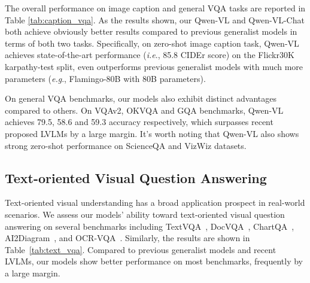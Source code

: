 \documentclass{article}
\begin{document}
The overall performance on image caption and general VQA tasks are reported in Table \ref{tab:caption_vqa}.  As the results shown, our Qwen-VL and Qwen-VL-Chat both achieve obviously better results compared to previous generalist models in terms of both two tasks.
Specifically, on zero-shot image caption task, Qwen-VL achieves state-of-the-art performance (\emph{i.e}., 85.8 CIDEr score) on the Flickr30K karpathy-test split, even outperforms previous generalist models with much more parameters (\emph{e.g}., Flamingo-80B with 80B parameters).

On general VQA benchmarks, our models also exhibit distinct advantages compared to others. On VQAv2, OKVQA and GQA benchmarks, Qwen-VL achieves 79.5, 58.6 and 59.3 accuracy respectively, which surpasses recent proposed LVLMs by a large margin.
It's worth noting that Qwen-VL also shows strong zero-shot performance on ScienceQA and VizWiz datasets.

\subsection{Text-oriented Visual Question Answering}

Text-oriented visual understanding has a broad application prospect in real-world scenarios. We assess our models' ability toward text-oriented visual question answering on several benchmarks including TextVQA~\citep{sidorov2020textcaps}, DocVQA~\citep{docvqa}, ChartQA~\citep{masry2022chartqa}, AI2Diagram~\citep{kembhavi2016diagram}, and OCR-VQA~\citep{ocrvqa}.
Similarly, the results are shown in Table~\ref{tab:text_vqa}. Compared to previous generalist models and recent LVLMs, our models show better performance on most benchmarks, frequently by a large margin.
\end{document}
